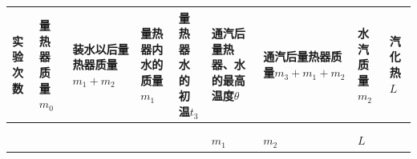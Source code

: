 {\def\LTcaptype{none} %
\begin{longtable}[]{@{}
  >{\raggedright\arraybackslash}p{}
  >{\raggedright\arraybackslash}p{}
  >{\raggedright\arraybackslash}p{}
  >{\raggedright\arraybackslash}p{}
  >{\raggedright\arraybackslash}p{}
  >{\raggedright\arraybackslash}p{}
  >{\raggedright\arraybackslash}p{}
  >{\raggedright\arraybackslash}p{}
  >{\raggedright\arraybackslash}p{}@{}}
\toprule\noalign{}
\begin{minipage}[b]{\linewidth}\raggedright
实验次数
\end{minipage} & \begin{minipage}[b]{\linewidth}\raggedright
量热器质量\(m_0\)
\end{minipage} & \begin{minipage}[b]{\linewidth}\raggedright
装水以后量热器质量\(m_1 + m_2\)
\end{minipage} & \begin{minipage}[b]{\linewidth}\raggedright
量热器内水的质量\(m_1\)
\end{minipage} & \begin{minipage}[b]{\linewidth}\raggedright
量热器水的初温\(t_3\)
\end{minipage} & \begin{minipage}[b]{\linewidth}\raggedright
通汽后量热器、水的最高温度\(\theta\)
\end{minipage} & \begin{minipage}[b]{\linewidth}\raggedright
通汽后量热器质量\(m_3 + m_1 + m_2\)
\end{minipage} & \begin{minipage}[b]{\linewidth}\raggedright
水汽质量\(m_2\)
\end{minipage} & \begin{minipage}[b]{\linewidth}\raggedright
汽化热\(L\)
\end{minipage} \\
\midrule\noalign{}
\endhead
\bottomrule\noalign{}
\endlastfoot
& & & & & & & & \\
& & & & & & & & \\
& & & & & \(m_1\) & \(m_2\) & \(L\) & \\
\end{longtable}
}

